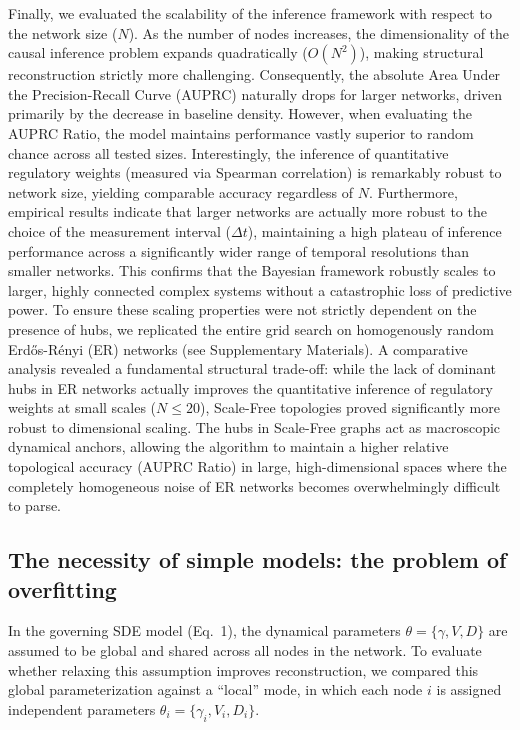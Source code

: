 \documentclass[10pt, aps, rmp,  twocolumn, superscriptaddress, floatfix, showkeys]{revtex4-2}
\begin{document}
Finally, we evaluated the scalability of the inference framework with respect to the network size ($N$). As the number of nodes increases, the dimensionality of the causal inference problem expands quadratically ($O(N^2)$), making structural reconstruction strictly more challenging. Consequently, the absolute Area Under the Precision-Recall Curve (AUPRC) naturally drops for larger networks, driven primarily by the decrease in baseline density. However, when evaluating the AUPRC Ratio, the model maintains performance vastly superior to random chance across all tested sizes. Interestingly, the inference of quantitative regulatory weights (measured via Spearman correlation) is remarkably robust to network size, yielding comparable accuracy regardless of $N$. Furthermore, empirical results indicate that larger networks are actually more robust to the choice of the measurement interval ($\Delta t$), maintaining a high plateau of inference performance across a significantly wider range of temporal resolutions than smaller networks. This confirms that the Bayesian framework robustly scales to larger, highly connected complex systems without a catastrophic loss of predictive power. To ensure these scaling properties were not strictly dependent on the presence of hubs, we replicated the entire grid search on homogenously random Erdős-Rényi (ER) networks (see Supplementary Materials). A comparative analysis revealed a fundamental structural trade-off: while the lack of dominant hubs in ER networks actually improves the quantitative inference of regulatory weights at small scales ($N \le 20$), Scale-Free topologies proved significantly more robust to dimensional scaling. The hubs in Scale-Free graphs act as macroscopic dynamical anchors, allowing the algorithm to maintain a higher relative topological accuracy (AUPRC Ratio) in large, high-dimensional spaces where the completely homogeneous noise of ER networks becomes overwhelmingly difficult to parse.

\subsection{The necessity of simple models: the problem of overfitting}

In the governing SDE model (Eq.~1), the dynamical parameters $\theta = \{\gamma, V, D\}$ are assumed to be global and shared across all nodes in the network. To evaluate whether relaxing this assumption improves reconstruction, we compared this global parameterization against a ``local'' mode, in which each node $i$ is assigned independent parameters $\theta_i = \{\gamma_i, V_i, D_i\}$.
\end{document}
